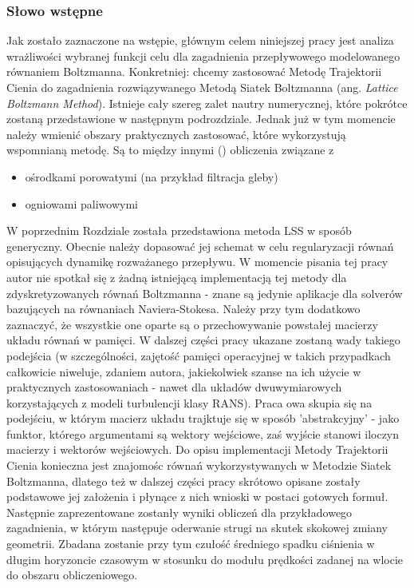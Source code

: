 \documentclass[12pt]{article}
\begin{document}
\subsubsection{Słowo wstępne}
Jak zostało zaznaczone na wstępie, głównym celem niniejszej pracy jest analiza wrażliwości wybranej funkcji celu dla zagadnienia przepływowego modelowanego równaniem Boltzmanna. Konkretniej: chcemy zastosować Metodę Trajektorii Cienia do zagadnienia rozwiązywanego Metodą Siatek Boltzmanna (ang. \textit{Lattice Boltzmann Method}). Istnieje cały szereg zalet nautry numerycznej, które pokrótce zostaną przedstawione w następnym podrozdziale. Jednak już w tym momencie należy wmienić obszary praktycznych zastosować, które wykorzystują wspomnianą metodę. Są to między innymi (\cite{Espinoza}) obliczenia związane z
\begin{itemize}
	\item ośrodkami porowatymi (na przykład filtracja gleby)
	\item ogniowami paliwowymi
\end{itemize}
W poprzednim Rozdziale została przedstawiona metoda LSS w sposób generyczny. Obecnie należy dopasować jej schemat w celu regularyzacji równań opisujących dynamikę rozważanego przepływu. W momencie pisania tej pracy autor nie spotkał się z żadną istniejącą implementacją tej metody dla zdyskretyzowanych równań Boltzmanna - znane są jedynie aplikacje dla solverów bazujących na równaniach Naviera-Stokesa. Należy przy tym dodatkowo zaznaczyć, że wszystkie one oparte są o przechowywanie powstałej macierzy układu równań w pamięci. W dalszej części pracy ukazane zostaną wady takiego podejścia (w szczególności, zajętość pamięci operacyjnej w takich przypadkach całkowicie niweluje, zdaniem autora, jakiekolwiek szanse na ich użycie w praktycznych zastosowaniach - nawet dla układów dwuwymiarowych korzystających z modeli turbulencji klasy RANS). Praca owa skupia się na podejściu, w którym macierz układu trajktuje się w sposób 'abstrakcyjny' - jako funktor, którego argumentami są wektory wejściowe, zaś wyjście stanowi iloczyn macierzy i wektorów wejściowych.
Do opisu implementacji Metody Trajektorii Cienia konieczna jest znajomośc równań wykorzystywanych w Metodzie Siatek Boltzmanna, dlatego też w dalszej części pracy skrótowo opisane zostały podstawowe jej założenia i płynące z nich wnioski w postaci gotowych formuł. Następnie zaprezentowane zostanły wyniki obliczeń dla przykładowego zagadnienia, w którym następuje oderwanie strugi na skutek skokowej zmiany geometrii. Zbadana zostanie przy tym czułość średniego spadku ciśnienia w długim horyzoncie czasowym w stosunku do modułu prędkości zadanej na wlocie do obszaru obliczeniowego.
\end{document}
